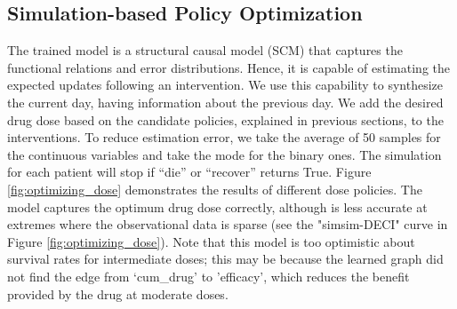 \subsection{Simulation-based Policy Optimization}

The trained model is a structural causal model (SCM) that captures the functional relations and error distributions. Hence, it is capable of estimating the expected updates following an intervention. We use this capability to synthesize the current day, having information about the previous day. We add the desired drug dose based on the candidate policies, explained in previous sections, to the interventions. To reduce estimation error, we take the average of 50 samples for the continuous variables and take the mode for the binary ones. The simulation for each patient will stop if ``die'' or ``recover'' returns True. Figure \ref{fig:optimizing_dose} demonstrates the results of different dose policies. The model captures the optimum drug dose correctly, although is less accurate at extremes where the observational data is sparse (see the "simsim-DECI" curve in Figure \ref{fig:optimizing_dose}). Note that this model is too optimistic about survival rates for intermediate doses; this may be because the learned graph did not find the edge from `cum\_drug' to 'efficacy', which reduces the benefit provided by the drug at moderate doses.




